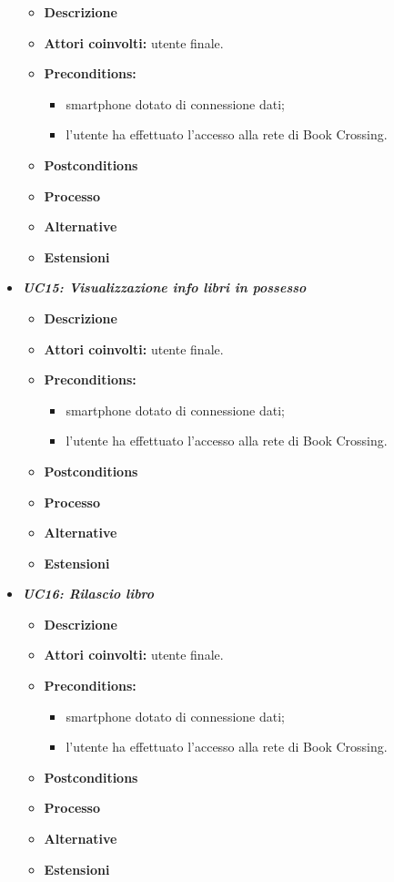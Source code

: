 \begin{itemize}
	\begin{itemize}
		\item \textbf{Descrizione}
		\item \textbf{Attori coinvolti:}  utente finale.
		\item \textbf{Preconditions:}
		\begin{itemize}
			\item smartphone dotato di connessione dati;
			\item l’utente ha effettuato l’accesso alla rete di Book Crossing.
		\end{itemize}
		\item \textbf{Postconditions}
		\item \textbf{Processo}
		\item \textbf{Alternative}
		\item \textbf{Estensioni}
	\end{itemize}
	\item \textbf{\textit{UC15: Visualizzazione info libri in possesso}}
	\begin{itemize}
		\item \textbf{Descrizione}
		\item \textbf{Attori coinvolti:}  utente finale.
		\item \textbf{Preconditions:}
		\begin{itemize}
			\item smartphone dotato di connessione dati;
			\item l’utente ha effettuato l’accesso alla rete di Book Crossing.
		\end{itemize}
		\item \textbf{Postconditions}
		\item \textbf{Processo}
		\item \textbf{Alternative}
		\item \textbf{Estensioni}
	\end{itemize}
	\item \textbf{\textit{UC16: Rilascio libro}}
	\begin{itemize}
		\item \textbf{Descrizione}
		\item \textbf{Attori coinvolti:} utente finale.
		\item \textbf{Preconditions:}
		\begin{itemize}
			\item smartphone dotato di connessione dati;
			\item l’utente ha effettuato l’accesso alla rete di Book Crossing.
		\end{itemize}
		\item \textbf{Postconditions}
		\item \textbf{Processo}
		\item \textbf{Alternative}
		\item \textbf{Estensioni}
	\end{itemize}
\end{itemize}